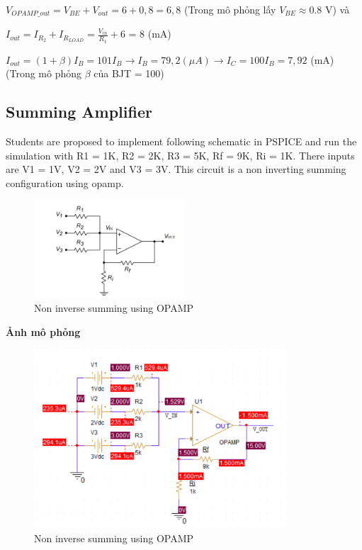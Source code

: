 $V_{OPAMP\_out} = V_{BE} + V_{out} = 6 + 0,8 = 6,8$ (Trong mô phỏng lấy $V_{BE} \approx 0.8$ V) và

$I_{out} = I_{R_2} + I_{R_{LOAD}} = \frac{V_{in}}{R_1} + 6$ = 8 (mA)

$I_{out} = (1+\beta)I_B  = 101I_B \rightarrow I_B = 79,2 (\mu A) \rightarrow I_C = 100I_B = 7,92$ (mA) (Trong mô phỏng $\beta$ của BJT = 100)
\pagebreak
\subsection{Summing Amplifier}
Students are proposed to implement following schematic in PSPICE and run the simulation with R1 = 1K, R2 = 2K, R3 = 5K, Rf = 9K, Ri = 1K. There inputs are V1 = 1V, V2 = 2V and
V3 = 3V. This circuit is a non inverting summing configuration using opamp.

\begin{figure}[ht]
    \centering
    \includegraphics[width=0.5\textwidth]{graphics/ex1/f9.png}
    \caption{Non inverse summing using OPAMP}
\end{figure}

\textbf{Ảnh mô phỏng}

\begin{figure}[ht]
    \centering
    \includegraphics[width=0.84\textwidth]{graphics/ex1/f11.png}
    \caption{Non inverse summing using OPAMP}
\end{figure}
\pagebreak

